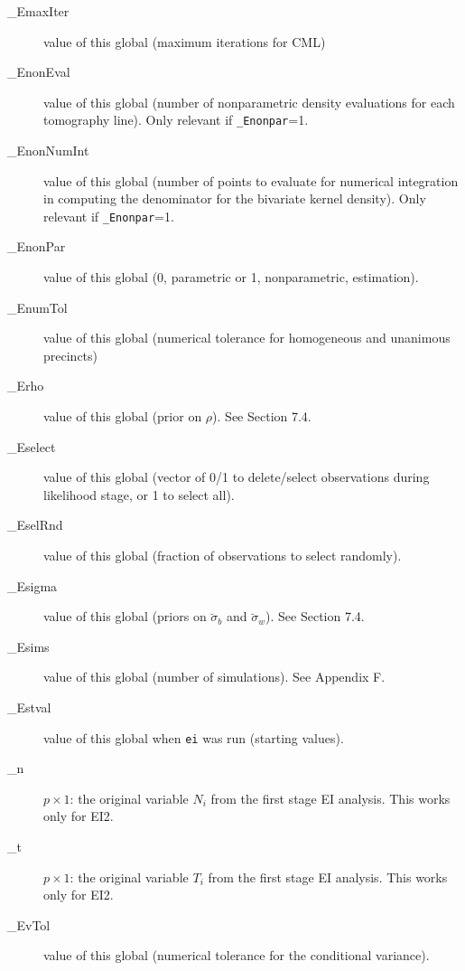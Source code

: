 \documentclass[11pt,titlepage]{article}
\newcommand{\sigmau}{\breve{\sigma}}
\begin{document}
\begin{description}
\item[\_EmaxIter] value of this global (maximum iterations for CML)

\item[\_EnonEval] value of this global (number of nonparametric
  density evaluations for each tomography line).  Only relevant if
  \texttt{\_Enonpar}=1.

\item[\_EnonNumInt] value of this global (number of points to evaluate
  for numerical integration in computing the denominator for the
  bivariate kernel density).  Only relevant if \texttt{\_Enonpar}=1.

\item[\_EnonPar] value of this global (0, parametric or 1,
  nonparametric, estimation).

\item[\_EnumTol] value of this global (numerical tolerance for
  homogeneous and unanimous precincts)

\item[\_Erho] value of this global (prior on $\rho$).  See Section
  7.4.

\item[\_Eselect] value of this global (vector of 0/1 to delete/select
  observations during likelihood stage, or 1 to select all).

\item[\_EselRnd] value of this global (fraction of observations to
  select randomly).

\item[\_Esigma] value of this global (priors on $\sigmau_b$ and
  $\sigmau_w$).  See Section 7.4.

\item[\_Esims] value of this global (number of simulations).  See
  Appendix F.

\item[\_Estval] value of this global when \texttt{ei} was run
  (starting values).

\item[\_n] $p\times 1$: the original variable $N_i$ from the first
  stage EI analysis.  This works only for EI2.

\item[\_t] $p\times 1$: the original variable $T_i$ from the first
  stage EI analysis.  This works only for EI2.

\item[\_EvTol] value of this global (numerical tolerance for the
  conditional variance).


\end{description}
\end{document}
